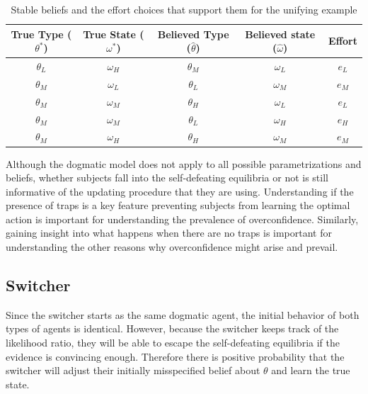 \documentclass[
  12pt,
]{article}
\begin{document}
\begin{table}[htbp]

    \centering
    \begin{tabular}{|c|c|c|c|c|}
        \hline
        \textbf{True Type ($\theta^*$)} & \textbf{True State ($\omega^*$)} & \textbf{Believed Type ($\hat{\theta}$)} & \textbf{Believed state ($\hat{\omega}$)} & \textbf{Effort} \\
        \hline
        \hline
        $\theta_L$ & $\omega_H$ & $\theta_M$ & $\omega_L$ & $e_L$ \\
        \hline
        $\theta_M$ & $\omega_L$ & $\theta_L$ & $\omega_M$ & $e_M$ \\
        \hline
        $\theta_M$ & $\omega_M$ & $\theta_H$ & $\omega_L$ & $e_L$ \\
        \hline
        $\theta_M$ & $\omega_M$ & $\theta_L$ & $\omega_H$ & $e_H$ \\
        \hline
        $\theta_M$ & $\omega_H$ & $\theta_H$ & $\omega_M$ & $e_M$ \\
        \hline
        
        
    \end{tabular}
    \caption{Stable beliefs and the effort choices that support them for the unifying example}
    \label{tab:table-dog}
\end{table}

Although the dogmatic model does not apply to all possible
parametrizations and beliefs, whether subjects fall into the
self-defeating equilibria or not is still informative of the updating
procedure that they are using. Understanding if the presence of traps is
a key feature preventing subjects from learning the optimal action is
important for understanding the prevalence of overconfidence. Similarly,
gaining insight into what happens when there are no traps is important
for understanding the other reasons why overconfidence might arise and
prevail.

\hypertarget{switcher}{%
\subsection{Switcher}\label{switcher}}

Since the switcher starts as the same dogmatic agent, the initial
behavior of both types of agents is identical. However, because the
switcher keeps track of the likelihood ratio, they will be able to
escape the self-defeating equilibria if the evidence is convincing
enough. Therefore there is positive probability that the switcher will
adjust their initially misspecified belief about \(\theta\) and learn
the true state.
\end{document}
